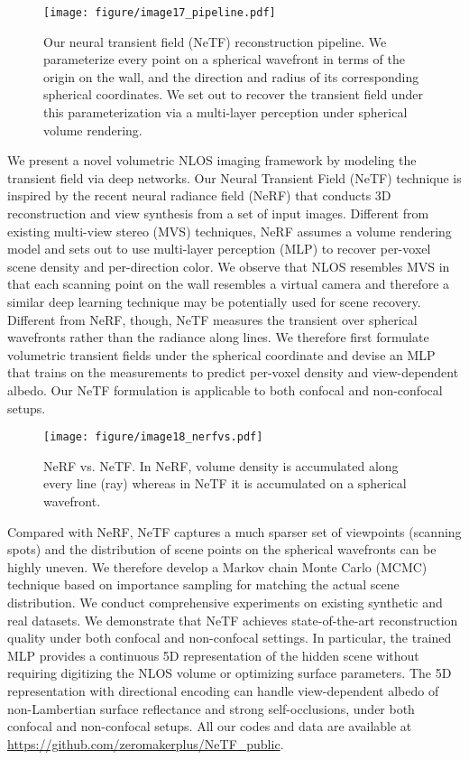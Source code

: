 \documentclass[10pt,journal,compsoc]{IEEEtran}
\begin{document}
\begin{figure*}[htbp]
\centering
\texttt{[image: figure/image17\_pipeline.pdf]}
\caption{Our neural transient field (NeTF) reconstruction pipeline. We parameterize every point on a spherical wavefront in terms of the origin on the wall, and the direction and radius of its corresponding spherical coordinates. We set out to recover the transient field under this parameterization via a multi-layer perception under spherical volume rendering.}
\label{Pipeline}
\end{figure*}

We present a novel volumetric NLOS imaging framework by modeling the transient field via deep networks. Our Neural Transient Field (NeTF) technique is inspired by the recent neural radiance field (NeRF) that conducts 3D reconstruction and view synthesis from a set of input images. Different from existing multi-view stereo (MVS) techniques, NeRF assumes a volume rendering model and sets out to use multi-layer perception (MLP) to recover per-voxel scene density and per-direction color. We observe that NLOS resembles MVS in that each scanning point on the wall resembles a virtual camera and therefore a similar deep learning technique may be potentially used for scene recovery. Different from NeRF, though, NeTF measures the transient over spherical wavefronts rather than the radiance along lines. We therefore first formulate volumetric transient fields under the spherical coordinate and devise an MLP that trains on the measurements to predict per-voxel density and view-dependent albedo. Our NeTF formulation is applicable to both confocal and non-confocal setups. 

\begin{figure}[!h]
\centering
\texttt{[image: figure/image18\_nerfvs.pdf]}
\caption{NeRF vs. NeTF. In NeRF, volume density is accumulated along every line (ray) whereas in NeTF it is accumulated on a spherical wavefront. }
\label{NeRFvsNLOS}
\end{figure}


Compared with NeRF, NeTF captures a much sparser set of viewpoints (scanning spots) and the distribution of scene points on the spherical wavefronts can be highly uneven. We therefore develop a Markov chain Monte Carlo (MCMC) technique based on importance sampling for matching the actual scene distribution. We conduct comprehensive experiments on existing synthetic and real datasets. We demonstrate that NeTF achieves state-of-the-art reconstruction quality under both confocal and non-confocal settings. In particular, the trained MLP provides a continuous 5D representation of the hidden scene without requiring digitizing the NLOS volume or optimizing surface parameters. The 5D representation with directional encoding can handle view-dependent albedo of non-Lambertian surface reflectance and strong self-occlusions, under both confocal and non-confocal setups. All our codes and data are available at \url{https://github.com/zeromakerplus/NeTF_public}.
\end{document}
